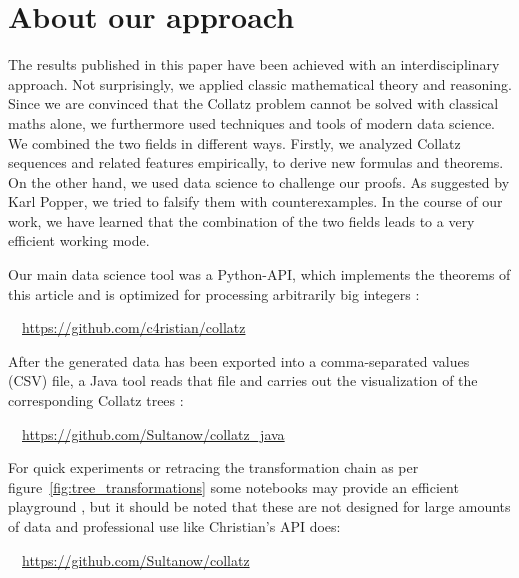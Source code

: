 \chapter*{About our approach}
\label{ch:our_approach}
\vspace{0.8cm}

The results published in this paper have been achieved with an interdisciplinary approach. Not surprisingly, we applied classic mathematical theory and reasoning. Since we are convinced that the Collatz problem cannot be solved with classical maths alone, we furthermore used techniques and tools of modern data science. We combined the two fields in different ways. Firstly, we analyzed Collatz sequences and related features empirically, to derive new formulas and theorems. On the other hand, we used data science to challenge our proofs. As suggested by Karl Popper, we tried to falsify them with counterexamples. In the course of our work, we have learned that the combination of the two fields leads to a very efficient working mode.

Our main data science tool was a Python-API, which implements the theorems of this article and is optimized for processing arbitrarily big integers \cite{Ref_Koch_Github}:

\par\bigskip
\textcolor{wisogreen}\faExternalLink~~\url{https://github.com/c4ristian/collatz}

\par\bigskip\noindent
After the generated data has been exported into a comma-separated values (CSV) file, a Java tool reads that file and carries out the visualization of the corresponding Collatz trees \cite{Ref_Sultanow_Github_Java}:

\par\bigskip
\textcolor{wisogreen}\faExternalLink~~\url{https://github.com/Sultanow/collatz_java}

\par\bigskip
For quick experiments or retracing the transformation chain as per figure~\ref{fig:tree_transformations} some notebooks may provide an efficient playground \cite{Ref_Sultanow_Github}, but it should be noted that these are not designed for large amounts of data and professional use like Christian's API does:

\par\bigskip
\textcolor{wisogreen}\faExternalLink~~\url{https://github.com/Sultanow/collatz}